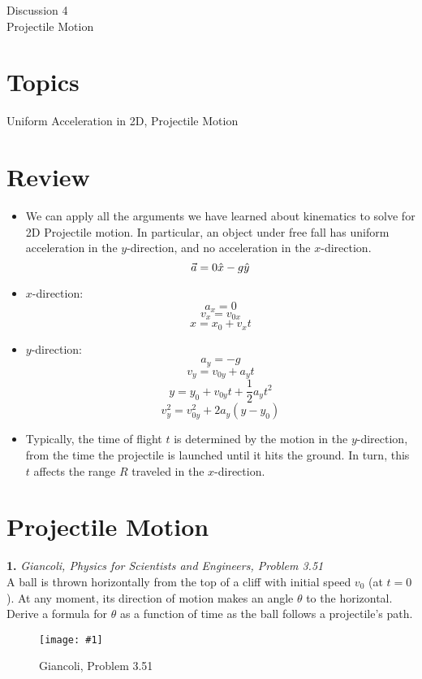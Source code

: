 \documentclass[11pt]{article}
\newcommand{\fig}[4]{
    \begin{figure}[H]
        \centering
        \texttt{[image: \#1]}
        \caption{#2}
        \label{exp4fit}
    \end{figure}
}
\theoremstyle{gangnamstyle}{\newtheorem{definition}{Definition}[]}
\theoremstyle{gangnamstyle}{\newtheorem{example}{Example}[]}
\theoremstyle{gangnamstyle}{\newtheorem{problem}{Problem}[]}
\begin{document}
\normalfont
\pagestyle{pages}


\begin{center}
\vspace{3in}
{\Large Discussion 4 } \\ [0.05in]
Projectile Motion \\ [-0.5in]
\end{center}

\section*{Topics}
Uniform Acceleration in 2D, Projectile Motion

\section{Review}

\begin{itemize}
\item We can apply all the arguments we have learned about kinematics to solve for 2D Projectile motion. In particular, an object under free fall has uniform acceleration in the $y$-direction, and no acceleration in the $x$-direction. 
\[ \Vec{a} = 0\Hat{x} - g\Hat{y} \]

\item $x$-direction:
\[ a_x = 0 \]
\[ v_x = v_{0x} \]
\[ x = x_0 + v_x t \]

\item $y$-direction:
\[ a_y = -g \]
\[ v_y = v_{0y} + a_yt \]
\[ y = y_0 + v_{0y}t + \frac{1}{2}a_yt^2 \]
\[ v_y^2 = v_{0y}^2 + 2a_y(y - y_0) \]

\item Typically, the time of flight $t$ is determined by the motion in the $y$-direction, from the time the projectile is launched until it hits the ground. In turn, this $t$ affects the range $R$ traveled in the $x$-direction. 

\end{itemize}

\pagebreak

\section{Projectile Motion}

\textbf{1.} \textit{Giancoli, Physics for Scientists and Engineers, Problem 3.51} \\
A ball is thrown horizontally from the top of a cliff with initial speed $v_0$ (at $t = 0$). At any moment, its direction of motion makes an angle $\theta$ to the horizontal. Derive a formula for $\theta$ as a function of time as the ball follows a projectile’s path. 
\fig{figs/0620/proj.png}{Giancoli, Problem 3.51}{0.75}{0}
\vspace{2 in}
\end{document}
